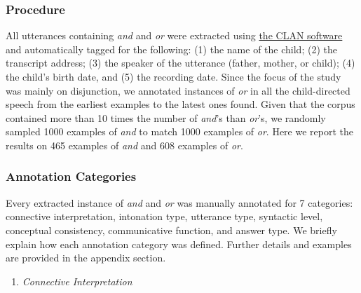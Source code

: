 \documentclass[,man,floatsintext]{apa6}
\providecommand{\tightlist}{%
  \setlength{\itemsep}{0pt}\setlength{\parskip}{0pt}}
\begin{document}
\hypertarget{procedure-1}{%
\subsubsection{Procedure}\label{procedure-1}}

All utterances containing \emph{and} and \emph{or} were extracted using \href{http://alpha.talkbank.org/clan/}{the CLAN software} and automatically tagged for the following: (1) the name of the child; (2) the transcript address; (3) the speaker of the utterance (father, mother, or child); (4) the child's birth date, and (5) the recording date. Since the focus of the study was mainly on disjunction, we annotated instances of \emph{or} in all the child-directed speech from the earliest examples to the latest ones found. Given that the corpus contained more than 10 times the number of \emph{and}'s than \emph{or}'s, we randomly sampled 1000 examples of \emph{and} to match 1000 examples of \emph{or}. Here we report the results on 465 examples of \emph{and} and 608 examples of \emph{or}.

\hypertarget{annotation-categories}{%
\subsubsection{Annotation Categories}\label{annotation-categories}}

Every extracted instance of \emph{and} and \emph{or} was manually annotated for 7 categories: connective interpretation, intonation type, utterance type, syntactic level, conceptual consistency, communicative function, and answer type. We briefly explain how each annotation category was defined. Further details and examples are provided in the appendix section.

\begin{enumerate}
\def\labelenumi{\arabic{enumi}.}
\tightlist
\item
  \emph{Connective Interpretation}
\end{enumerate}
\end{document}
